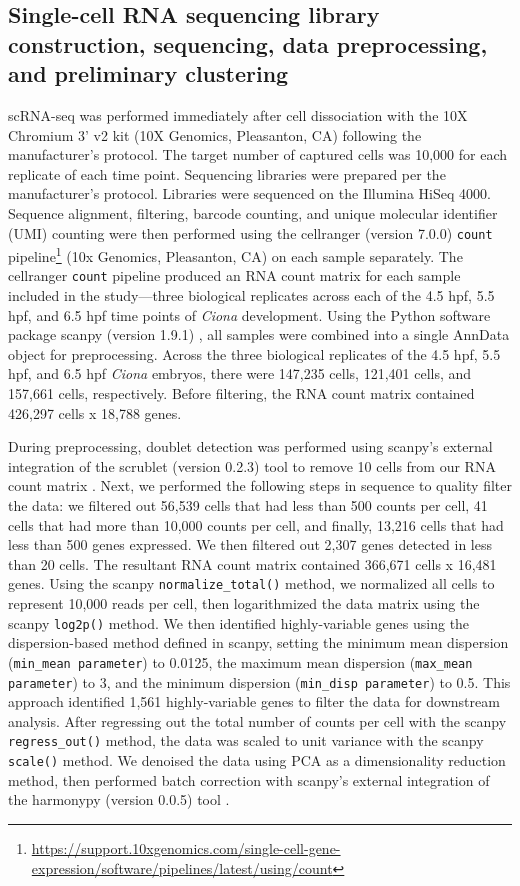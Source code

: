 \subsection{Single-cell RNA sequencing library construction, sequencing, data preprocessing, and preliminary clustering}
scRNA-seq was performed immediately after cell dissociation with the 10X Chromium 3' v2 kit (10X Genomics, Pleasanton, CA) following the manufacturer’s protocol. The target number of captured cells was 10,000 for each replicate of each time point. Sequencing libraries were prepared per the manufacturer’s protocol. Libraries were sequenced on the Illumina HiSeq 4000. Sequence alignment, filtering, barcode counting, and unique molecular identifier (UMI) counting were then performed using the cellranger (version 7.0.0) \verb|count| pipeline\footnote{\href{https://support.10xgenomics.com/single-cell-gene-expression/software/pipelines/latest/using/count}{https://support.10xgenomics.com/single-cell-gene-expression/software/pipelines/latest/using/count}} (10x Genomics, Pleasanton, CA) on each sample separately. The cellranger \verb|count| pipeline produced an RNA count matrix for each sample included in the study—three biological replicates across each of the 4.5 hpf, 5.5 hpf, and 6.5 hpf time points of \textit{Ciona} development. Using the Python software package scanpy (version 1.9.1) \cite{wolf2018}, all samples were combined into a single AnnData object for preprocessing. Across the three biological replicates of the 4.5 hpf, 5.5 hpf, and 6.5 hpf \textit{Ciona} embryos, there were 147,235 cells, 121,401 cells, and 157,661 cells, respectively. Before filtering, the RNA count matrix contained 426,297 cells x 18,788 genes. 

During preprocessing, doublet detection was performed using scanpy's external integration of the scrublet (version 0.2.3) tool to remove 10 cells from our RNA count matrix \cite{wolock2019}. Next, we performed the following steps in sequence to quality filter the data: we filtered out 56,539 cells that had less than 500 counts per cell, 41 cells that had more than 10,000 counts per cell, and finally, 13,216 cells that had less than 500 genes expressed. We then filtered out 2,307 genes detected in less than 20 cells. The resultant RNA count matrix contained 366,671 cells x 16,481 genes. Using the scanpy \verb|normalize_total()| method, we normalized all cells to represent 10,000 reads per cell, then logarithmized the data matrix using the scanpy \verb|log2p()| method. We then identified highly-variable genes using the dispersion-based method defined in scanpy, setting the minimum mean dispersion (\verb|min_mean parameter|) to 0.0125, the maximum mean dispersion (\verb|max_mean parameter|) to 3, and the minimum dispersion (\verb|min_disp parameter|) to 0.5. This approach identified 1,561 highly-variable genes to filter the data for downstream analysis. After regressing out the total number of counts per cell with the scanpy \verb|regress_out()| method, the data was scaled to unit variance with the scanpy \verb|scale()| method. We denoised the data using PCA as a dimensionality reduction method, then performed batch correction with scanpy's external integration of the harmonypy (version 0.0.5) tool \cite{slowikowski2022}. 


